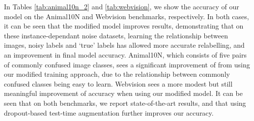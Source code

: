 \documentclass[10pt,twocolumn,letterpaper]{article}
\begin{document}
\begin{table}[t!]
    \begin{center}
    \end{center}
    \caption{Test accuracy (\%) for Webvision. Top methods within 0.5\% in \textbf{bold}}
    \label{tab:webvision}
\end{table}



In Tables \ref{tab:animal10n_2} and \ref{tab:webvision}, we show the accuracy of our model on the Animal10N and Webvision benchmarks, respectively. In both cases, it can be seen that the modified model improves results, demonstrating that on these instance-dependant noise datasets, learning the relationship between images, noisy labels and `true' labels has allowed more accurate relabelling, and an improvement in final model accuracy. Animal10N, which consists of five pairs of commonly confused image classes, sees a significant improvement of  from using our modified training approach, due to the relationship between commonly confused classes being easy to learn. Webvision sees a more modest but still meaningful improvement of  accuracy when using our modified model.
It can be seen that on both benchmarks, we report state-of-the-art results, and that using dropout-based test-time augmentation further improves our accuracy.
\end{document}
